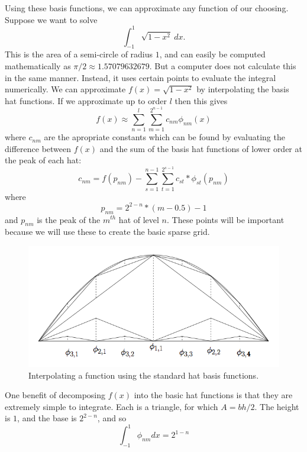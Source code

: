Using these basis functions, we can approximate any function of our choosing.  Suppose we want to solve
\begin{equation*}
\int_{-1}^{1} \sqrt{1-x^2}\: dx .
\end{equation*}
This is the area of a semi-circle of radius $1$, and can easily be computed mathematically as $\pi / 2 \approx 1.57079632679$.  But a computer does not calculate this in the same manner.  Instead, it uses certain points to evaluate the integral numerically.  We can approximate $f(x) = \sqrt{1-x^2}$ by interpolating the basis hat functions.  If we approximate up to order $l$ then this gives
\begin{equation*}
f(x) \approx \sum_{n=1}^l \sum_{m=1}^{2^{n-1}} c_{nm} \phi_{nm}(x) 
\end{equation*}
where $c_{nm}$ are the apropriate constants which can be found by evaluating the difference between $f(x)$ and the sum of the basis hat functions of lower order at the peak of each hat:
\begin{equation}
c_{nm} = f(p_{nm}) - \sum_{s=1}^{n-1} \sum_{t=1}^{2^{s-1}} c_{st}*\phi_{st}(p_{nm})
\end{equation}
where
\begin{equation}
p_{nm}=2^{2-n}*(m-0.5)-1
\label{eq:points}
\end{equation}
and $p_{nm}$ is the peak of the $m^{th}$ hat of level $n$.  These points will be important because we will use these to create the basic sparse grid.

\begin{center}
\begin{figure}
\includegraphics[width=.7\textwidth]{HB.png}
\caption{Interpolating a function using the standard hat basis functions.}
\label{fig:HB}
\end{figure}
\end{center}

One benefit of decomposing $f(x)$ into the basic hat functions is that they are extremely simple to integrate.  Each is a triangle, for which $A=bh/2$.  The height is $1$, and the base is $2^{2-n}$, and so
\begin{equation*}
\int_{-1}^1 \phi_{nm} dx= 2^{1-n}
\end{equation*}

